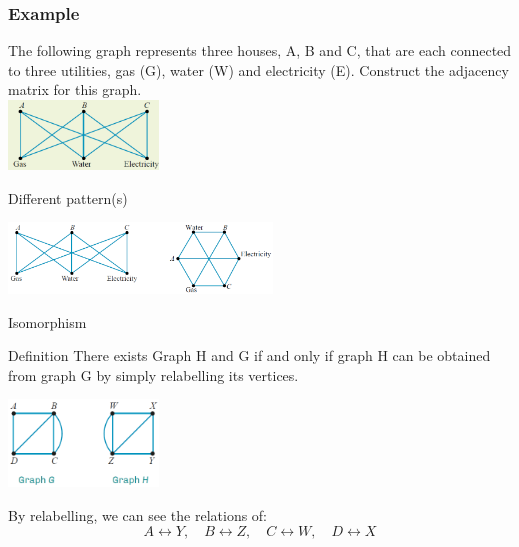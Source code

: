 \documentclass[
	11pt, %
]{beamer}
\begin{document}
\begin{frame}[t]
    \frametitle{Example}
    The following graph represents three houses, A, B and C, that are each connected to
    three utilities, gas (G), water (W) and electricity (E). Construct the adjacency matrix for
    this graph.\\
    \includegraphics[width = 4cm]{Graph3.png}\\
\end{frame}

\begin{frame}{Different pattern(s)}
    \begin{center}
        \includegraphics[width = 7cm]{Graph4.png}\\
    \end{center}
\end{frame}

\begin{frame}{Isomorphism}
    \begin{block}{Definition}
        There exists Graph H and G if and only if graph H can be obtained from graph G by simply relabelling its vertices.
        \begin{center}
            \includegraphics[width = 4cm]{Graph5.png}
        \end{center}
    \end{block}
    By relabelling, we can see the relations of:\\
    \[
        A \leftrightarrow Y, \quad B \leftrightarrow Z, \quad C \leftrightarrow W, \quad D \leftrightarrow X
    \]
\end{frame}
\end{document}
